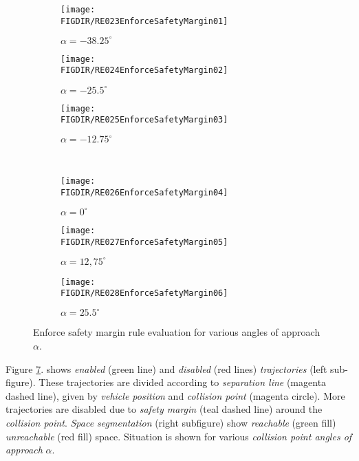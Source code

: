 \begin{figure}[H]
	\centering
    \begin{subfigure}{0.32\textwidth}
    	\centering
        \texttt{[image: \\FIGDIR/RE023EnforceSafetyMargin01]} 
        \vfill
        \caption{$\alpha=-38.25^\circ$}
        \label{fig:ruleEnforceSafetyMargin01}
    \end{subfigure}
    \begin{subfigure}{0.32\textwidth}
    	\centering
        \texttt{[image: \\FIGDIR/RE024EnforceSafetyMargin02]} 
        \vfill
        \caption{$\alpha=-25.5^\circ$}
        \label{fig:ruleEnforceSafetyMargin02}
    \end{subfigure}
    \begin{subfigure}{0.32\textwidth}
    	\centering
        \texttt{[image: \\FIGDIR/RE025EnforceSafetyMargin03]} 
        \vfill
        \caption{$\alpha=-12.75^\circ$}
        \label{fig:ruleEnforceSafetyMargin03}
    \end{subfigure}
    \\
    \begin{subfigure}{0.32\textwidth}
    	\centering
        \texttt{[image: \\FIGDIR/RE026EnforceSafetyMargin04]} 
        \vfill
        \caption{$\alpha=0^\circ$}
        \label{fig:ruleEnforceSafetyMargin04}
    \end{subfigure}
    \begin{subfigure}{0.32\textwidth}
    	\centering
        \texttt{[image: \\FIGDIR/RE027EnforceSafetyMargin05]} 
        \vfill
        \caption{$\alpha=12,75^\circ$}
        \label{fig:ruleEnforceSafetyMargin05}
    \end{subfigure}
    \begin{subfigure}{0.32\textwidth}
    	\centering
        \texttt{[image: \\FIGDIR/RE028EnforceSafetyMargin06]} 
        \vfill
        \caption{$\alpha=25.5^\circ$}
        \label{fig:ruleEnforceSafetyMargin06}
    \end{subfigure}
    \caption{Enforce safety margin rule evaluation for various angles of approach $\alpha$.}        
    \label{fig:ruleEnforceSafetyMarginGeneral}
\end{figure}

\noindent Figure \ref{fig:ruleEnforceSafetyMarginGeneral}. shows \emph{enabled} (green line) and \emph{disabled} (red lines) \emph{trajectories} (left sub-figure). These trajectories are divided according to \emph{separation line} (magenta dashed line), given by \emph{vehicle position} and \emph{collision point} (magenta circle). More trajectories are disabled due to \emph{safety  margin} (teal dashed line) around the  \emph{collision point}. \emph{Space segmentation} (right subfigure) show \emph{reachable} (green fill) \emph{unreachable} (red fill) space. Situation is shown for various \emph{collision point angles of approach} $\alpha$.

